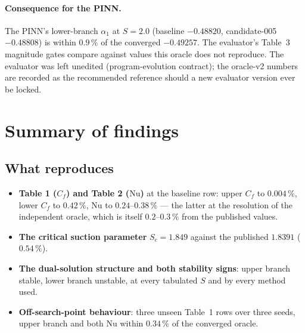 \documentclass[11pt,a4paper]{article}
\newcommand{\pct}{\,\%}
\begin{document}
\paragraph{Consequence for the PINN.} The PINN's lower-branch $\alpha_1$ at $S{=}2.0$
(baseline $-0.48820$, candidate-005 $-0.48808$) is within $0.9\pct$ of the converged
$-0.49257$. The evaluator's Table~3 magnitude gates compare against values this oracle does
not reproduce. The evaluator was left unedited (program-evolution contract); the oracle-v2
numbers are recorded as the recommended reference should a new evaluator version ever be
locked.

\section{Summary of findings}

\subsection{What reproduces}
\begin{itemize}[leftmargin=1.4em,itemsep=1pt]
  \item \textbf{Table 1 ($C_f$) and Table 2 ($\mathrm{Nu}$)} at the baseline row: upper
        $C_f$ to $0.004\pct$, lower $C_f$ to $0.42\pct$, $\mathrm{Nu}$ to $0.24$--$0.38\pct$
        --- the latter at the resolution of the independent oracle, which is itself
        $0.2$--$0.3\pct$ from the published values.
  \item \textbf{The critical suction parameter} $S_c = 1.849$ against the published
        $1.8391$ ($0.54\pct$).
  \item \textbf{The dual-solution structure and both stability signs}: upper branch stable,
        lower branch unstable, at every tabulated $S$ and by every method used.
  \item \textbf{Off-search-point behaviour}: three unseen Table~1 rows over three seeds,
        upper branch and both $\mathrm{Nu}$ within $0.34\pct$ of the converged oracle.
\end{itemize}
\end{document}
